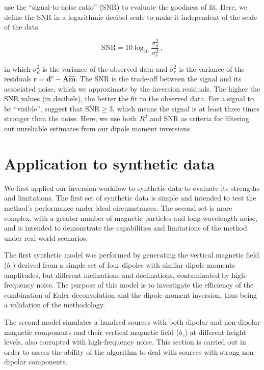 \citet{CortesOrtuno2021} use the ``signal-to-noise ratio'' (SNR) to evaluate the goodness of fit.
Here, we define the SNR in a logarithmic decibel scale to make it independent of the scale of the data

\begin{equation}
\label{eq_snr}
\text{SNR} = 10 \log_{10}\dfrac{\sigma^2_d}{\sigma^2_r}\ ,
\end{equation}

\noindent
in which $\sigma^2_d$ is the variance of the observed data and $\sigma^2_r$ is the variance of the residuals $\mathbf{r} = \mathbf{d}^o - \mathbf{A}\hat{\mathbf{m}}$.
The SNR is the trade-off between the signal and its associated noise, which we approximate by the inversion residuals.
The higher the SNR values (in decibels), the better the fit to the observed data.
For a signal to be ``visible'', \citet{Strum2014} suggest that $\text{SNR} \ge 3$, which means the signal is at least three times stronger than the noise.
Here, we use both $R^2$ and SNR as criteria for filtering out unreliable estimates from our dipole moment inversions.


\section{Application to synthetic data}

We first applied our inversion workflow to synthetic data to evaluate its strengths and limitations.
The first set of synthetic data is simple and intended to test the method's performance under ideal circumstances.
The second set is more complex, with a greater number of magnetic particles and long-wavelength noise, and is intended to demonstrate the capabilities and limitations of the method under real-world scenarios.

The first synthetic model was performed by generating the vertical magnetic field ($b_z$) derived from a simple set of four dipoles with similar dipole moments amplitudes, but different inclinations and declinations, contaminated by high-frequency noise.
The purpose of this model is to investigate the efficiency of the combination of Euler deconvolution and the dipole moment inversion, thus being a validation of the methodology.

The second model simulates a hundred sources with both dipolar and non-dipolar magnetic components and their vertical magnetic field ($b_z$) at different height levels, also corrupted with high-frequency noise. This section is carried out in order to assess the ability of the algorithm to deal with sources with strong non-dipolar components.


